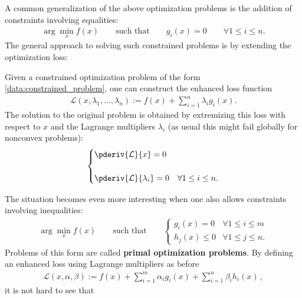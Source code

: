     A common generalization of the above optimization problems is the addition of constraints involving equalities:
    \begin{gather}
        \label{data:constrained_problem}
        \arg\min_x f(x) \qquad\text{such that}\qquad g_i(x)=0\qquad\forall 1\leq i\leq n.
    \end{gather}
    The general approach to solving such constrained problems is by extending the optimization loss:
    \begin{method}
        Given a constrained optimization problem of the form \eqref{data:constrained_problem}, one can construct the enhanced loss function
        \begin{gather}
            \mathcal{L}(x,\lambda_1,\ldots,\lambda_n) := f(x) + \sum_{i=1}^n\lambda_ig_i(x).
        \end{gather}
        The solution to the original problem is obtained by extremizing this loss with respect to $x$ and the Lagrange multipliers $\lambda_i$ (as usual this might fail globally for nonconvex problems):
        \begin{gather}
            \begin{cases}
                \pderiv{\mathcal{L}}{x} = 0\\\\
                \pderiv{\mathcal{L}}{\lambda_i} = 0&\forall1\leq i\leq n.
            \end{cases}
        \end{gather}
    \end{method}
    The situation becomes even more interesting when one also allows constraints involving inequalities:
    \begin{gather}
        \label{data:constrained_optimization}
        \arg\min_xf(x)\qquad\text{such that}\qquad
        \begin{cases}
            g_i(x)=0&\forall 1\leq i\leq m\\
            h_j(x)\leq0&\forall 1\leq j\leq n.
        \end{cases}
    \end{gather}
    Problems of this form are called \textbf{primal optimization problems}. By defining an enhanced loss using Lagrange multipliers as before
    \begin{gather}
        \mathcal{L}(x,\alpha,\beta) := f(x) + \sum_{i=1}^m\alpha_ig_i(x) + \sum_{i=1}^n\beta_ih_i(x)\,,
    \end{gather}
    it is not hard to see that
